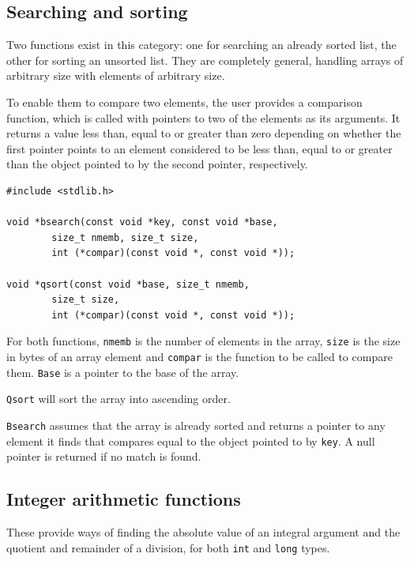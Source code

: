   

  \subsection{Searching and sorting}
   

   Two functions exist in this category: one for searching an already sorted
    list, the other for sorting an unsorted list.  They are completely general,
    handling arrays of arbitrary size with elements of arbitrary size.


   To enable them to compare two elements, the user provides a comparison
    function, which is called with pointers to two of the elements as its
    arguments.  It returns a value less than, equal to or greater than zero
    depending on whether the first pointer points to an element considered to
    be less than, equal to or greater than the object pointed to by the second
    pointer, respectively.


   \begin{Verbatim}
#include <stdlib.h>

void *bsearch(const void *key, const void *base,
        size_t nmemb, size_t size,
        int (*compar)(const void *, const void *));

void *qsort(const void *base, size_t nmemb,
        size_t size,
        int (*compar)(const void *, const void *));
\end{Verbatim}

   For both functions, \texttt{nmemb} is the number of elements  in  the
    array,  \texttt{size}  is  the  size in bytes of an array element and
    \texttt{compar} is the function to be called to compare  them.
    \texttt{Base} is a pointer to the base of the array.


   \texttt{Qsort} will sort the array into ascending order.


   \texttt{Bsearch} assumes that the array is already sorted and returns
    a pointer to any element it finds that compares equal to the object pointed
    to by \texttt{key}.  A null pointer is returned if  no match is
    found.


  

  \subsection{Integer arithmetic functions}
   

   These provide ways of finding the absolute value of an integral argument
    and the quotient and remainder of a division, for both \texttt{int} and
    \texttt{long} types.


